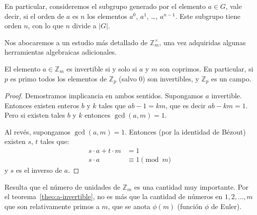   En particular,
  consideremos el subgrupo generado por el elemento \(a \in G\),%
  vale decir,
  si el orden de \(a\) es \(n\)
  los elementos \(a^0\), \(a^1\), \ldots, \(a^{n - 1}\).
  Este subgrupo tiene orden \(n\),
  con lo que \(n\) divide a \(\lvert G \rvert\).

  Nos abocaremos a un estudio más detallado de \(\mathbb{Z}^\times_m\),
  una vez adquiridas algunas herramientas algebraicas adicionales.
  \begin{theorem}
    \label{theo:a-invertible}
    El elemento \(a \in \mathbb{Z}_m\) es invertible
    si y solo si \(a\) y \(m\) son coprimos.
    En particular,
    si \(p\) es primo todos los elementos de \(\mathbb{Z}_p\)
    (salvo \(0\))
    son invertibles,
    y \(\mathbb{Z}_p\) es un campo.%
  \end{theorem}
  \begin{proof}
    Demostramos implicancia en ambos sentidos.
    Supongamos \(a\) invertible.
    Entonces existen enteros \(b\) y \(k\) tales que \(a b - 1 = k m\),
    que es decir \(a b - k m = 1\).
    Pero si existen tales \(b\) y \(k\) entonces \(\gcd(a, m) = 1\).

    Al revés,
    supongamos \(\gcd(a, m) = 1\).
    Entonces
    (por la identidad de Bézout)%
    existen \(s\), \(t\) tales que:
    \begin{align*}
      s \cdot a + t \cdot m
	&=	1\\
      s \cdot a
	&\equiv 1 \pmod{m}
    \end{align*}
    y \(s\) es el inverso de \(a\).
  \end{proof}
  Resulta que el número de unidades de \(\mathbb{Z}_m\)
  es una cantidad muy importante.
  Por el teorema~\ref{theo:a-invertible},
  no es más que la cantidad de números en \(1, 2, \dotsc, m\)
  que son relativamente primos a \(m\),
  que se anota \(\phi(m)\)
  (función \(\phi\) de Euler).%

